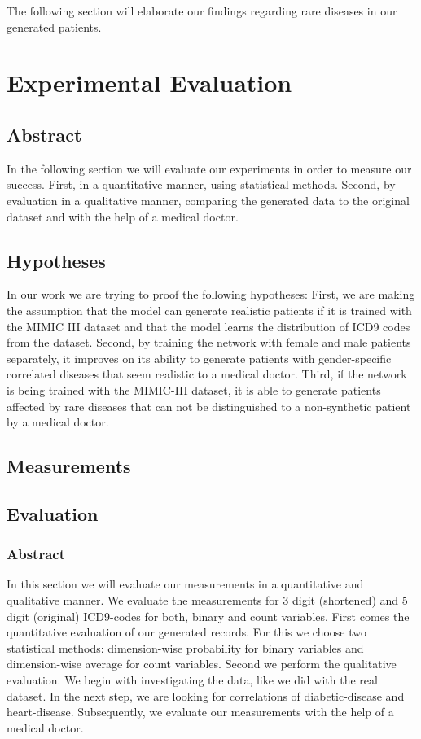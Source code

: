 \documentclass[11pt, a4paper]{book}
\begin{document}
The following section will elaborate our findings regarding rare diseases in our generated patients.
\chapter{Experimental Evaluation}
\section{Abstract}
In the following section we will evaluate our experiments in order to measure our success. First, in a quantitative manner, using statistical methods. Second, by evaluation in a qualitative manner, comparing the generated data to the original dataset and with the help of a medical doctor.
\section{Hypotheses}
In our work we are trying to proof the following hypotheses:
First, we are making the assumption that the model can generate realistic patients if it is trained with the MIMIC III dataset and that the model learns the distribution of ICD9 codes from the dataset.
Second, by training the network with female and male patients separately, it improves on its ability to generate patients with gender-specific correlated diseases that seem realistic to a medical doctor.
Third, if the network is being trained with the MIMIC-III dataset, it is able to generate patients affected by rare diseases that can not be distinguished to a non-synthetic patient by a medical doctor.
\section{Measurements}

\section{Evaluation}
\subsection{Abstract}
In this section we will evaluate our measurements in a quantitative and qualitative manner. We evaluate the measurements for 3 digit (shortened) and 5 digit (original) ICD9-codes for both, binary and count variables.
First comes the quantitative evaluation of our generated records. For this we choose two statistical methods: dimension-wise probability for binary variables and dimension-wise average for count variables.
Second we perform the qualitative evaluation. We begin with investigating the data, like we did with the real dataset. In the next step, we are looking for correlations of diabetic-disease and heart-disease. Subsequently, we evaluate our measurements with the help of a medical doctor.
\end{document}
